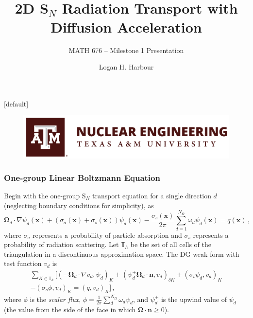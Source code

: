 \documentclass[xcolor={usenames,dvipsnames,svgnames,table}]{beamer}
\title[2D S$_N$ with Diffusion Acceleration]{2D S$_N$ Radiation Transport with Diffusion Acceleration}
\subtitle{MATH 676 -- Milestone 1 Presentation}
\author[Logan Harbour]{Logan H. Harbour}
\institute[]{Department of Nuclear Engineering \\ Texas A\&M University}
\date[March 20, 2019]
\newcommand{\vx}{\mathbf{x}} %
\newcommand{\vo}{\pmb{\Omega}} %
\newcommand{\vn}{\mathbf{n}} %
\newcommand{\pinp}[2]{\left(#1,#2\right)}
\begin{document}
{
[default] 
\begin{frame}
\vfill
\titlepage
\vfill
\begin{figure}[t]
	\centering
	\includegraphics[width=.5\textwidth]{images/nuen}
\end{figure}
\vfill
\end{frame}
}


\begin{frame}\frametitle{One-group Linear Boltzmann Equation}
	Begin with the one-group S$_N$ transport equation for a single direction $d$ (neglecting boundary conditions for simplicity), as	
	\begin{equation}
		\label{eq:boltzmann}
		\vo_d \cdot \nabla \psi_d(\vx) + \left(\sigma_a(\vx) + \sigma_s(\vx)\right) \psi_d(\vx) - \frac{\sigma_s(\vx)}{2\pi} \sum_{d = 1}^{N_\Omega} \omega_d \psi_d(\vx) = q(\vx)\,,
	\end{equation}
	where $\sigma_a$ represents a probability of particle absorption and $\sigma_s$ represents a probability of radiation scattering. Let $\mathbb{T}_h$ be the set of all cells of the triangulation in a discontinuous approximation space. The DG weak form with test function $v_d$ is
	\begin{multline}
		\sum_{K \in \mathbb{T}_h} \Big[ \pinp{-\vo_d \cdot \nabla v_d}{\psi_d}_K + \pinp{\psi_d^+ \vo_d \cdot \vn}{v_d}_{\delta K} + \pinp{\sigma_t \psi_d}{v_d}_K  \\ - \pinp{\sigma_s \phi}{v_d}_K = \pinp{q}{v_d}_K\Big]\,,
	\end{multline}
	where $\phi$ is the \textit{scalar flux}, $\phi = \frac{1}{2\pi} \sum_d^{N_\Omega} \omega_d \psi_d$, and $\psi_d^+$ is the upwind value of $\psi_d$ (the value from the side of the face in which $\vo \cdot \vn \geq 0$).
\end{frame}

\end{document}

